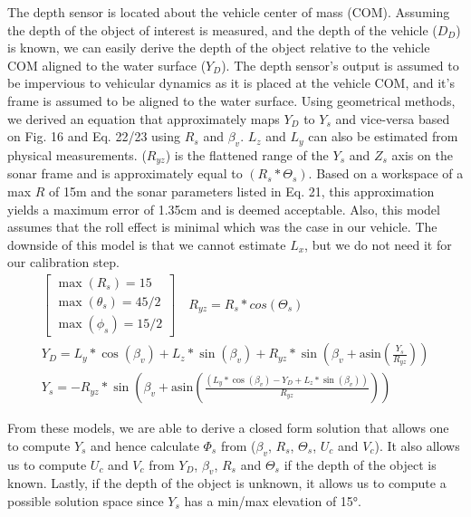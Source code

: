 \documentclass[15pt]{article}
\let\Theta\varTheta
\let\Phi\varPhi
\newcommand{\RSonar}{$\si{\textit{R}_{s}}$\xspace}
\newcommand{\ThetaSonar}{$\si{\Theta_{s}}$\xspace}
\newcommand{\PhiSonar}{$\si{\Phi_{s}}$\xspace}
\newcommand{\UCamera}{$\si{\textit{U}_{c}}$\xspace}
\newcommand{\VCamera}{$\si{\textit{V}_{c}}$\xspace}
\newcommand{\YSonar}{$\si{\textit{Y}_{s}}$\xspace}
\newcommand{\Depth}{$D_{D}$\xspace}
\newcommand{\YDepth}{$Y_{D}$\xspace}
\newcommand{\PitchVehicle}{${\beta_{v}}$\xspace}
\begin{document}
The depth sensor is located about the vehicle center of mass (COM). Assuming the depth of the object of interest is measured, and the depth of the vehicle (\Depth) is known, we can easily derive the depth of the object relative to the vehicle COM aligned to the water surface (\YDepth). The depth sensor's output is assumed to be impervious to vehicular dynamics as it is placed at the vehicle COM, and it's frame is assumed to be aligned to the water surface. Using geometrical methods, we derived an equation that approximately maps \YDepth to \YSonar and vice-versa based on Fig. 16 and Eq. 22/23 using \RSonar and \PitchVehicle. $L_{z}$ and $L_{y}$ can also be estimated from physical measurements. ($R_{yz}$) is the flattened range of the $Y_{s}$ and $Z_{s}$ axis on the sonar frame and is approximately equal to $(R_{s}*\Theta_{s})$. Based on a workspace of a max $R$ of 15m and the sonar parameters listed in Eq. 21, this approximation yields a maximum error of 1.35cm and is deemed acceptable. Also, this model assumes that the roll effect is minimal which was the case in our vehicle. The downside of this model is that we cannot estimate $L_{x}$, but we do not need it for our calibration step.
\begin{gather}
\left[\begin{array}{c}
\max\left(R_{s}\right)=15\\
\max\left(\theta_{s}\right)=45/2\\
\max\left(\phi_{s}\right)=15/2
\end{array}\right]\quad R_{yz}=R_{s}*cos(\Theta_{s})\\
Y_{D}=L_{y}*\cos\left(\beta_{v}\right)+L_{z}*\sin\left(\beta_{v}\right)+R_{yz}*\sin\left(\beta_{v}+\mbox{asin}\left(\frac{Y_{s}}{R_{yz}}\right)\right) \\
Y_{s}=-R_{yz}*\sin\left(\beta_{v}+\mbox{asin}\left(\frac{\left(L_{y}*\cos\left(\beta_{v}\right)-Y_{D}+L_{z}*\sin\left(\beta_{v}\right)\right)}{R_{yz}}\right)\right)
\end{gather}

From these models, we are able to derive a closed form solution that allows one to compute \YSonar and hence calculate \PhiSonar from (\PitchVehicle, \RSonar, \ThetaSonar, \UCamera and \VCamera).  It also allows us to compute \UCamera and \VCamera from \YDepth, \PitchVehicle, \RSonar and \ThetaSonar if the depth of the object is known. Lastly, if the depth of the object is unknown, it allows us to compute a possible solution space since \YSonar has a min/max elevation of 15\si{\degree}.
\end{document}
